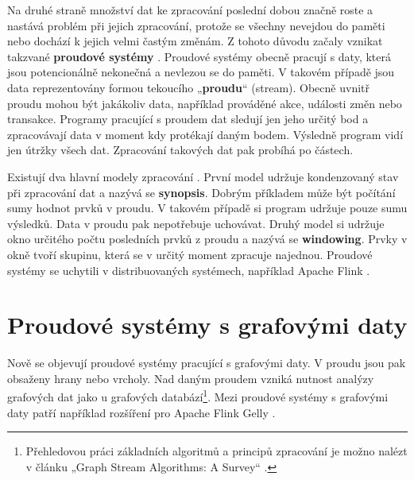 Na druhé straně množství dat ke zpracování poslední dobou značně roste a nastává problém při jejich zpracování, protože se všechny nevejdou do paměti nebo dochází k jejich velmi častým změnám.  
Z tohoto důvodu začaly vznikat takzvané \textbf{proudové systémy} \citep{streaming}.
Proudové systémy obecně pracují s daty, která jsou potencionálně nekonečná a nevlezou se do paměti.
V takovém případě jsou data reprezentovány formou tekoucího „\textbf{proudu}“ (stream).
Obecně uvnitř proudu mohou být jakákoliv data, například prováděné akce, události změn nebo transakce.
Programy pracující s proudem dat sledují jen jeho určitý bod a zpracovávají data v moment kdy protékají daným bodem.
Výsledně program vidí jen útržky všech dat.
Zpracování takových dat pak probíhá po částech.

Existují dva hlavní modely zpracování \citep{graphstreaming}.
První model udržuje kondenzovaný stav při zpracování dat a nazývá se \textbf{synopsis}.
Dobrým příkladem může být počítání sumy hodnot prvků v proudu.
V takovém případě si program udržuje pouze sumu výsledků.
Data v proudu pak nepotřebuje uchovávat.
Druhý model si udržuje okno určitého počtu posledních prvků z proudu a nazývá se \textbf{windowing}.
Prvky v okně tvoří skupinu, která se v určitý moment zpracuje najednou.
Proudové systémy se uchytili v distribuovaných systémech, například Apache Flink \citep{apacheflink}.

\section*{Proudové systémy s grafovými daty}

Nově se objevují proudové systémy pracující s grafovými daty.
V proudu jsou pak obsaženy hrany nebo vrcholy. 
Nad daným proudem vzniká nutnost analýzy grafových dat jako u grafových databází\footnote{Přehledovou práci základních algoritmů a principů zpracování je možno nalézt v článku „Graph Stream Algorithms: A Survey“ \citep{graphstreamalgorithms}.}.
Mezi proudové systémy s grafovými daty patří například rozšíření pro Apache Flink Gelly \citep{apacheflinkgelly}.

